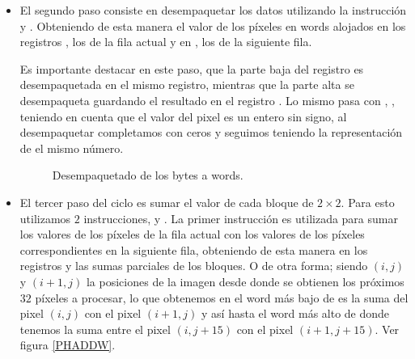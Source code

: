 \begin{itemize}
  \item El segundo paso consiste en desempaquetar los datos utilizando la instrucción  y . Obteniendo de esta manera el valor de los píxeles en words alojados en los registros ,  los de la fila actual y en ,  los de la siguiente fila.

  Es importante destacar en este paso, que la parte baja del registro  es desempaquetada en el mismo registro, mientras que la parte alta se desempaqueta guardando el resultado en el registro . Lo mismo pasa con , , teniendo en cuenta que el valor del pixel es un entero sin signo, al desempaquetar completamos con ceros y seguimos teniendo la representación de el mismo número.

  \begin{figure}[H]
    \centering
    \caption{Desempaquetado de los bytes a words.}
    \label{PUNPCK}
  \end{figure}

  \item El tercer paso del ciclo es sumar el valor de cada bloque de $2 \times 2$. Para esto utilizamos $2$ instrucciones,  y . La primer instrucción es utilizada para sumar los valores de los píxeles de la fila actual con los valores de los píxeles correspondientes en la siguiente fila, obteniendo de esta manera en los registros  y  las sumas parciales de los bloques. O de otra forma; siendo $(i,j)$ y $(i+1,j)$ la posiciones de la imagen desde donde se obtienen los próximos $32$ píxeles a procesar, lo que obtenemos en el word más bajo de  es la suma del pixel $(i,j)$ con el pixel $(i+1,j)$ y así hasta el word más alto de  donde tenemos la suma entre el pixel $(i,j+15)$ con el pixel $(i+1,j+15)$. Ver figura \ref{PHADDW}.


\end{itemize}
